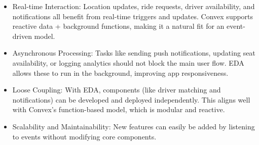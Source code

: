\documentclass[12pt]{article}
\begin{document}
\begin{itemize}
  \item Real-time Interaction: Location updates, ride requests, driver availability, and notifications all benefit from real-time triggers and updates. Convex supports reactive data + background functions, making it a natural fit for an event-driven model.
  \item Asynchronous Processing: Tasks like sending push notifications, updating seat availability, or logging analytics should not block the main user flow. EDA allows these to run in the background, improving app responsiveness.
  \item Loose Coupling: With EDA, components (like driver matching and notifications) can be developed and deployed independently. This aligns well with Convex’s function-based model, which is modular and reactive.
  \item Scalability and Maintainability: New features can easily be added by listening to events without modifying core components.
\end{itemize}
\end{document}
